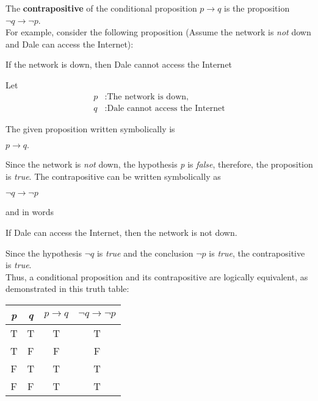 The \textbf{contrapositive} of the conditional proposition $p \rightarrow q$ is the proposition $\lnot q \rightarrow \lnot p$.\\

For example, consider the following proposition (Assume the network is \textit{not} down and Dale can access the Internet):

\begin{center}
    If the network is down, then Dale cannot access the Internet
\end{center}

Let
\begin{align*}
    p&: \text{The network is down,}\\
    q&: \text{Dale cannot access the Internet}
\end{align*}

The given proposition written symbolically is
\begin{center}
    $p \rightarrow q.$
\end{center}

Since the network is \textit{not} down, the hypothesis \textit{p} is \textit{false}, therefore, the proposition is \textit{true}.  The contrapositive can be written symbolically as
\begin{center}
    $\lnot q \rightarrow \lnot p$
\end{center}

and in words
\begin{center}
    If Dale can access the Internet, then the network is not down.
\end{center}

Since the hypothesis $\lnot q$ is \textit{true} and the conclusion $\lnot p$ is \textit{true}, the contrapositive is \textit{true}.\\

Thus, a conditional proposition and its contrapositive are logically equivalent, as demonstrated in this truth table:

\begin{table}[h]
\centering
\begin{tabular}{|c|c|c|c|}
\hline
\textit{p} & \textit{q} & $p \rightarrow q$ & $\lnot q \rightarrow \lnot p$ \\ \hline
T & T & T & T \\ \hline
T & F & F & F \\ \hline
F & T & T & T \\ \hline
F & F & T & T \\ \hline
\end{tabular}
\end{table}


























